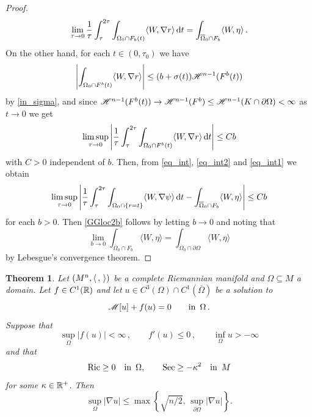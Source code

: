 \documentclass[10 pt,a4paper]{article}
\newtheorem{theorem}[definition]{Theorem}
\theoremstyle{definition}
\begin{document}
\begin{proof}
\begin{equation}
		\lim_{\tau\to0} \frac{1}{\tau} \int_\tau^{2\tau} \int_{\Omega_0\cap F_b(t)} \langle W, \nabla r \rangle \, \mathrm{d} t = \int_{\overline\Omega_0\cap F_b} \langle W, \eta\rangle \, .
	\end{equation}
	On the other hand, for each $t\in(0,\tau_0)$ we have
	\[
	\left| \int_{\Omega_0\cap F^b(t)} \langle W, \nabla r\rangle \right| \le (b+\sigma(t)) \mathscr{H}^{n-1}(F^b(t))
	\]
	by \eqref{in_sigma}, and since $\mathscr{H}^{n-1}(F^b(t)) \to \mathscr{H}^{n-1}(F^b) \leq \mathscr{H}^{n-1}(K\cap\partial\Omega) < \infty$ as $t \to 0$ we get
	\begin{equation}\label{eq_int1}
		\limsup_{\tau\to0} \left| \frac{1}{\tau} \int_\tau^{2\tau} \int_{\Omega_0\cap F^b(t)} \langle W, \nabla r \rangle \, \mathrm{d} t \right| \le C b
	\end{equation}
	with $C>0$ independent of $b$. Then, from \eqref{eq_int}, \eqref{eq_int2} and \eqref{eq_int1} we obtain
	\[
		\limsup_{\tau\to0} \left| \frac{1}{\tau} \int_\tau^{2\tau} \int_{\Omega_0\cap\{r=t\}} \langle W,\nabla\psi\rangle \, \mathrm{d} t - \int_{\overline{\Omega}_0\cap F_b} \langle W,\eta\rangle \right| \leq Cb
	\]
	for each $b>0$. Then \eqref{GGloc2b} follows by letting $b\to0$ and noting that
	\[
		\lim_{b\to0} \int_{\overline{\Omega}_0\cap F_b} \langle W,\eta\rangle = \int_{\overline{\Omega}_0\cap \partial\Omega} \langle W,\eta\rangle
	\]
	by Lebesgue's convergence theorem.
\end{proof}

\begin{theorem} \label{thm_prop_grad}
	Let $(M^n,\langle \, , \, \rangle)$ be a complete Riemannian manifold and $\Omega\subseteq M$ a domain. Let $f\in C^1(\mathbb R)$ and let $u\in C^3(\Omega) \cap C^1(\overline{\Omega})$ be a solution to
	\[
		\mathscr{M}[u] + f(u) = 0 \qquad \text{in } \, \Omega \, .
	\]
	Suppose that
	\[
		\sup_\Omega |f(u)| < \infty \, , \qquad f'(u) \leq 0 \, , \qquad \inf_\Omega u > -\infty
	\]
	and that
	\[
		\mathrm{Ric} \geq 0 \quad \text{in } \, \Omega , \qquad \mathrm{Sec} \geq - \kappa^2 \quad \text{in } \, M
	\]
	for some $\kappa\in\mathbb R^+$. Then
	\[
		\sup_\Omega |\nabla u| \leq \max\left\{ \sqrt{n/2}, \, \sup_{\partial\Omega} |\nabla u|\right\} .
	\]
\end{theorem}
\end{document}
